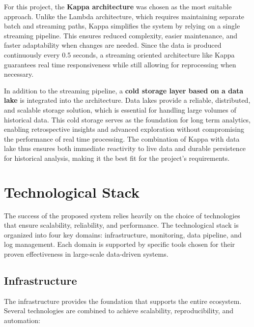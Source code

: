 For this project, the \textbf{Kappa architecture} was chosen as the most suitable approach. Unlike the Lambda architecture, which requires maintaining separate batch and streaming paths, Kappa simplifies the system by relying on a single streaming pipeline. This ensures reduced complexity, easier maintenance, and faster adaptability when changes are needed. Since the data is produced continuously every 0.5 seconds, a streaming oriented architecture like Kappa guarantees real time responsiveness while still allowing for reprocessing when necessary.

In addition to the streaming pipeline, a \textbf{cold storage layer based on a data lake } is integrated into the architecture. Data lakes provide a reliable, distributed, and scalable storage solution, which is essential for handling large volumes of historical data. This cold storage serves as the foundation for long term analytics, enabling retrospective insights and advanced exploration without compromising the performance of real time processing. The combination of Kappa with data lake thus ensures both immediate reactivity to live data and durable persistence for historical analysis, making it the best fit for the project’s requirements.

\section{Technological Stack}

The success of the proposed system relies heavily on the choice of technologies that ensure scalability, reliability, and performance. The technological stack is organized into four key domains: infrastructure, monitoring, data pipeline, and log management. Each domain is supported by specific tools chosen for their proven effectiveness in large-scale data-driven systems. 

\subsection{Infrastructure}

The infrastructure provides the foundation that supports the entire ecosystem. Several technologies are combined to achieve scalability, reproducibility, and automation:

